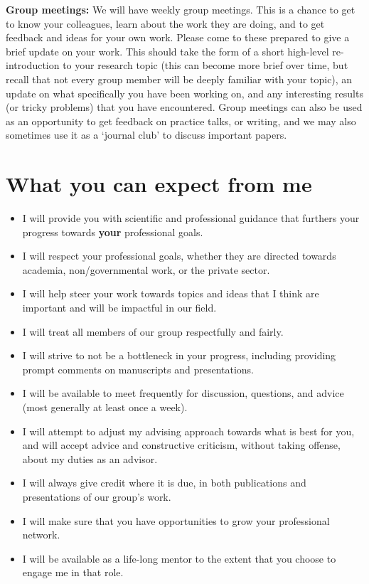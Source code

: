 \documentclass{classassignments}
\begin{document}
\textbf{Group meetings:} We will have weekly group meetings. This is a chance to get to know your colleagues, learn about the work they are doing, and to get feedback and ideas for your own work. Please come to these prepared to give a brief update on your work. This should take the form of a short high-level re-introduction to your research topic (this can become more brief over time, but recall that not every group member will be deeply familiar with your topic), an update on what specifically you have been working on, and any interesting results (or tricky problems) that you have encountered. Group meetings can also be used as an opportunity to get feedback on practice talks, or writing, and we may also sometimes use it as a `journal club' to discuss important papers. 

\section{What you can expect from me}
\begin{itemize}
	\item I will provide you with scientific and professional 	guidance that furthers your progress towards \textbf{your} professional goals.
	\item I will respect your professional goals, whether they are directed towards academia, non/governmental work, or the private sector.
	\item I will help steer your work towards topics and ideas that I think are important and will be impactful in our field.
	\item I will treat all members of our group respectfully and fairly.
	\item I will strive to not be a bottleneck in your progress, including providing prompt comments on manuscripts and presentations.
	\item I will be available to meet frequently for discussion, questions, and advice (most generally at least once a week).
	\item I will  attempt to adjust my advising approach towards what is best for you, and will accept advice and constructive criticism, without taking offense, about my duties as an advisor.
	\item I will always give credit where it is due, in both publications and presentations of our group's work.
	\item I will make sure that you have opportunities to grow your professional network.
	\item I will be available as a life-long mentor to the extent that you choose to engage me in that role.
\end{itemize}
\end{document}
